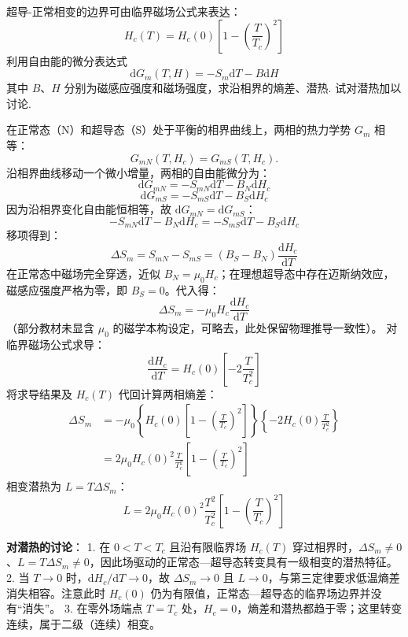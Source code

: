 \begin{exercise}\label{ex:14.10}
超导-正常相变的边界可由临界磁场公式来表达：
$$ H_c(T) = H_c(0)\left[ 1 - \left(\frac{T}{T_c}\right)^2 \right] $$
利用自由能的微分表达式
$$ \mathrm{d}G_m(T, H) = -S_m \mathrm{d}T - B \mathrm{d}H $$
其中 $B$、$H$ 分别为磁感应强度和磁场强度，求沿相界的熵差、潜热. 试对潜热加以讨论.
\end{exercise}
\begin{solution}
在正常态（N）和超导态（S）处于平衡的相界曲线上，两相的热力学势 $G_m$ 相等：
\[
G_{mN}(T,H_c)=G_{mS}(T,H_c).
\]
沿相界曲线移动一个微小增量，两相的自由能微分为：
$$ \mathrm{d}G_{mN} = -S_{mN} \mathrm{d}T - B_N \mathrm{d}H_c $$
$$ \mathrm{d}G_{mS} = -S_{mS} \mathrm{d}T - B_S \mathrm{d}H_c $$
因为沿相界变化自由能恒相等，故 $\mathrm{d}G_{mN} = \mathrm{d}G_{mS}$：
$$ -S_{mN} \mathrm{d}T - B_N \mathrm{d}H_c = -S_{mS} \mathrm{d}T - B_S \mathrm{d}H_c $$
移项得到：
$$ \Delta S_m = S_{mN} - S_{mS} = (B_S - B_N) \frac{\mathrm{d}H_c}{\mathrm{d}T} $$
在正常态中磁场完全穿透，近似 $B_N = \mu_0 H_c$；在理想超导态中存在迈斯纳效应，磁感应强度严格为零，即 $B_S = 0$。代入得：
$$ \Delta S_m = -\mu_0 H_c \frac{\mathrm{d}H_c}{\mathrm{d}T} $$
（部分教材未显含 $\mu_0$ 的磁学本构设定，可略去，此处保留物理推导一致性）。
对临界磁场公式求导：
$$ \frac{\mathrm{d}H_c}{\mathrm{d}T} = H_c(0) \left[ -2 \frac{T}{T_c^2} \right] $$
将求导结果及 $H_c(T)$ 代回计算两相熵差：
\begin{align*}
    \Delta S_m &= -\mu_0 \left\{ H_c(0) \left[ 1 - \left(\frac{T}{T_c}\right)^2 \right] \right\} \left\{ -2 H_c(0) \frac{T}{T_c^2} \right\} \\
    &= 2\mu_0 H_c(0)^2 \frac{T}{T_c^2} \left[ 1 - \left(\frac{T}{T_c}\right)^2 \right]
\end{align*}
相变潜热为 $L = T \Delta S_m$：
$$ L = 2\mu_0 H_c(0)^2 \frac{T^2}{T_c^2} \left[ 1 - \left(\frac{T}{T_c}\right)^2 \right] $$

\textbf{对潜热的讨论}：
1. 在 $0<T<T_c$ 且沿有限临界场 $H_c(T)$ 穿过相界时，$\Delta S_m\neq0$、$L=T\Delta S_m\neq0$，因此场驱动的正常态—超导态转变具有一级相变的潜热特征。
2. 当 $T\to0$ 时，$\mathrm{d}H_c/\mathrm{d}T\to0$，故 $\Delta S_m\to0$ 且 $L\to0$，与第三定律要求低温熵差消失相容。注意此时 $H_c(0)$ 仍为有限值，正常态—超导态的临界场边界并没有“消失”。
3. 在零外场端点 $T=T_c$ 处，$H_c=0$，熵差和潜热都趋于零；这里转变连续，属于二级（连续）相变。
\end{solution}

